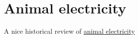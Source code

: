 
\section{Animal electricity\label{sec:AnimalElectricity}}
\cite{AnimalElecticity:2024}
A nice historical review of 
\href{https://www.mdpi.com/2218-273X/14/6/684}{animal electricity}